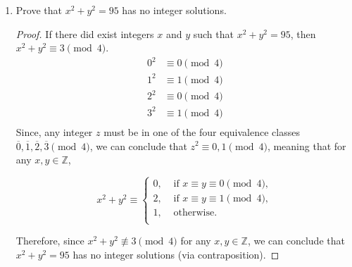 \documentclass[11pt]{article}
\newcommand{\Z}{\mathbb{Z}}
\begin{document}
\begin{enumerate}
    \item Prove that \(x^2 + y^2 = 95\) has no integer solutions.
      \begin{proof}
        If there did exist integers \(x\) and \(y\) such that \(x^2 + y^2 = 95\), then \(x^2 + y^2 \equiv 3 \pmod4\).
        \begin{align*}
          0^2 &\equiv 0 \pmod4 \\
          1^2 &\equiv 1 \pmod4 \\
          2^2 &\equiv 0 \pmod4 \\
          3^2 &\equiv 1 \pmod4 \\
        \end{align*}
        Since, any integer \(z\) must be in one of the four equivalence classes \(\overline{0},\overline{1},\overline{2},\overline{3} \pmod4\), we can conclude that \(z^2 \equiv 0,1 \pmod4\), meaning that for any \(x,y \in \Z\), 

        \[x^2 + y^2 \equiv \begin{cases}
          0, &\text{ if } x \equiv y \equiv 0 \pmod4, \\
          2, &\text{ if } x \equiv y \equiv 1 \pmod4, \\
          1, &\text{ otherwise.} \\
        \end{cases}\]

        Therefore, since \(x^2 + y^2 \not\equiv 3 \pmod4\) for any \(x,y \in \Z\), we can conclude that \(x^2 + y^2 = 95\) has no integer solutions (via contraposition).
      \end{proof}
      
  \end{enumerate}
\end{document}
